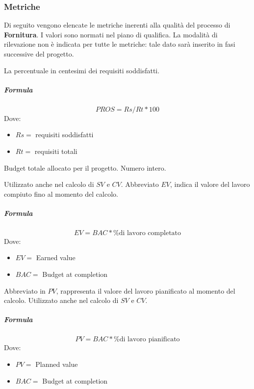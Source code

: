 		\subsubsection{Metriche}
        Di seguito vengono elencate le metriche inerenti alla qualità del processo di \textbf{Fornitura}. I valori sono normati nel piano di qualifica. La modalità di rilevazione non è indicata per tutte le metriche: tale dato sarà 
        inserito in fasi successive del progetto.
        
        La percentuale in centesimi dei requisiti soddisfatti.
        \subparagraph{Formula}
        \begin{displaymath}
         PROS = Rs / Rt *100
        \end{displaymath}
        Dove:
        \begin{itemize}
            \item[] $Rs =$ requisiti soddisfatti
            \item[] $Rt =$ requisiti totali
        \end{itemize}
        
        Budget totale allocato per il progetto.
         Numero intero.
        
        Utilizzato anche nel calcolo di $SV$ e $CV$. Abbreviato $EV$, indica il valore del lavoro compiuto fino al momento del calcolo.
        \subparagraph{Formula}
        \begin{displaymath}
          EV = BAC * \% \textrm{di lavoro completato}
        \end{displaymath}
        Dove:
        \begin{itemize}
            \item[] $EV =$ Earned value
            \item[] $BAC =$ Budget at completion
        \end{itemize}
        
        Abbreviato in $PV$, rappresenta il valore del lavoro pianificato al momento del calcolo. Utilizzato anche nel calcolo di $SV$ e $CV$.
        \subparagraph{Formula}
        \begin{displaymath}
          PV = BAC * \% \textrm{di lavoro pianificato}
        \end{displaymath}
        Dove:
        \begin{itemize}
            \item[] $PV =$ Planned value
            \item[] $BAC =$ Budget at completion
        \end{itemize}
        
